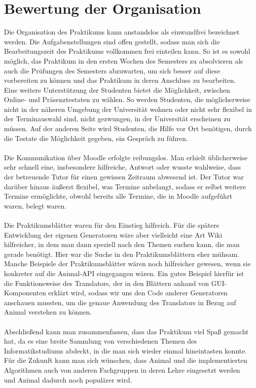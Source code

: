 \documentclass[nochapname]{tudexercise}
\begin{document}
	\section{Bewertung der Organisation}
		Die Organisation des Praktikums kann anstandslos als einwandfrei bezeichnet werden. Die Aufgabenstellungen sind offen gestellt, sodass man sich die Bearbeitungszeit des Praktikums vollkommen frei einteilen kann. So ist es sowohl möglich, das Praktikum in den ersten Wochen des Semesters zu absolvieren als auch die Prüfungen des Semesters abzuwarten, um sich besser auf diese vorbereiten zu können und das Praktikum in deren Anschluss zu bearbeiten.\\
		Eine weitere Unterstützung der Studenten bietet die Möglichkeit, zwischen Online- und Präsenztestaten zu wählen. So werden Studenten, die möglicherweise nicht in der näheren Umgebung der Universität wohnen oder nicht sehr flexibel in der Terminauswahl sind, nicht gezwungen, in der Universität erscheinen zu müssen. Auf der anderen Seite wird Studenten, die Hilfe vor Ort benötigen, durch die Testate die Möglichkeit gegeben, ein Gespräch zu führen.\\\\
		Die Kommunikation über Moodle erfolgte reibungslos. Man erhielt üblicherweise sehr schnell eine, insbesondere hilfreiche, Antwort oder wusste wahlweise, dass der betreuende Tutor für einen gewissen Zeitraum abwesend ist. Der Tutor war darüber hinaus äußerst flexibel, was Termine anbelangt, sodass er selbst weitere Termine ermöglichte, obwohl bereits alle Termine, die in Moodle aufgeführt waren, belegt waren.\\\\
		Die Praktikumsblätter waren für den Einstieg hilfreich. Für die spätere Entwicklung der eigenen Generatoren wäre aber vielleicht eine Art Wiki hilfreicher, in dem man dann speziell nach den Themen suchen kann, die man gerade benötigt. Hier war die Suche in den Praktikumsblättern eher mühsam. Manche Beispiele der Praktikumsblätter wären noch hilfreicher gewesen, wenn sie konkreter auf die Animal-API eingegangen wären. Ein gutes Beispiel hierfür ist die Funktionsweise des Translators, der in den Blättern anhand von GUI-Komponenten erklärt wird, sodass wir uns den Code anderer Generatoren anschauen mussten, um die genaue Anwendung des Translators in Bezug auf Animal verstehen zu können.\\\\
		Abschließend kann man zusammenfassen, dass das Praktikum viel Spaß gemacht hat, da es eine breite Sammlung von verschiedenen Themen des Informatikstudiums abdeckt, in die man sich wieder einmal hineintasten konnte. Für die Zukunft kann man sich wünschen, dass Animal und die implementierten Algorithmen auch von anderen Fachgruppen in deren Lehre eingesetzt werden und Animal dadurch noch populärer wird.
\end{document}
